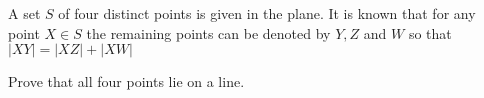 A set $S$ of four distinct points is given in the plane. It is known that for any point $X\in S$ the remaining points can be denoted by $Y,Z$ and $W$ so that$|XY|=|XZ|+|XW|$

Prove that all four points lie on a line.